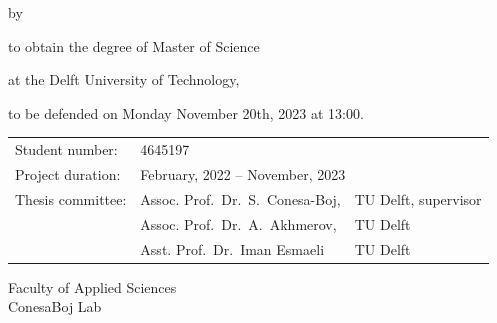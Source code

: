 \begin{titlepage}

\begin{center}

{\makeatletter
\fontsize{45}{45}\selectfont\@title
\makeatother}

{\makeatletter
\ifdefvoid{\@subtitle}{}{\bigskip\titlestyle\fontsize{20}{20}\selectfont\@subtitle}
\makeatother}

\bigskip
\bigskip

by

\bigskip
\bigskip

{\makeatletter
\fontsize{25}{25}\selectfont\@author
\makeatother}

\bigskip
\bigskip

to obtain the degree of Master of Science

at the Delft University of Technology,

to be defended on Monday November 20th, 2023 at 13:00.

\vfill

\begin{tabular}{lll}
    Student number: & 4645197 \\
    Project duration: & \multicolumn{2}{l}{February, 2022 -- November, 2023} \\
    Thesis committee: & Assoc. Prof.\ Dr.\ S.\ Conesa-Boj, & TU Delft, supervisor \\
        & Assoc. Prof.\ Dr.\ A.\ Akhmerov, & TU Delft \\
        & Asst. Prof.\ Dr.\ Iman Esmaeli & TU Delft
\end{tabular}


\bigskip
\bigskip
Faculty of Applied Sciences \\
ConesaBoj Lab \\


\end{center}


\end{titlepage}
